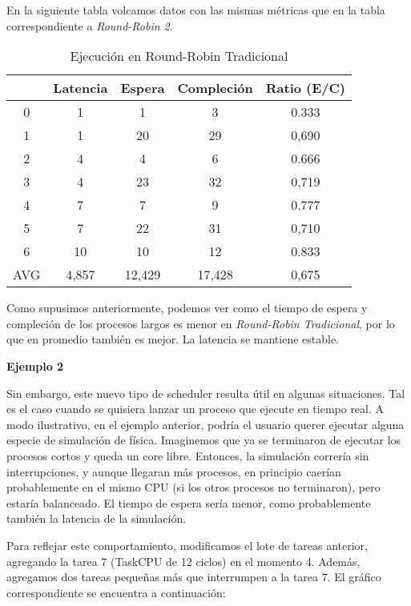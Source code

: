 En la siguiente tabla volcamos datos con las mismas métricas que en la tabla correspondiente a \textit{Round-Robin 2}.

\begin{table}[h]
  \caption{Ejecución en Round-Robin Tradicional}
  \centering
    \begin{tabular}{c c c c c}
    \hline
          & Latencia & Espera & Compleción & Ratio (E/C) \\
    \hline
        0 &     1    &    1   &      3     &    0.333    \\
        1 &     1    &   20   &     29     &    0,690    \\
        2 &     4    &    4   &      6     &    0.666    \\
        3 &     4    &   23   &     32     &    0,719    \\
        4 &     7    &    7   &      9     &    0.777    \\
        5 &     7    &   22   &     31     &    0,710    \\
        6 &     10   &   10   &     12     &    0.833    \\
        AVG & 4,857  & 12,429 &   17,428   &    0,675    \\
    \end{tabular}
\end{table}

Como supusimos anteriormente, podemos ver como el tiempo de espera y compleción de los procesos largos es menor en \textit{Round-Robin Tradicional}, por lo que en promedio también es mejor. La latencia se mantiene estable.

\bigskip

\textbf{Ejemplo 2}

Sin embargo, este nuevo tipo de scheduler resulta útil en algunas situaciones. Tal es el caso cuando se quisiera lanzar un proceso que ejecute en tiempo real. A modo ilustrativo, en el ejemplo anterior, podría el usuario querer ejecutar alguna especie de simulación de física. Imaginemos que ya se terminaron de ejecutar los procesos cortos y queda un core libre. Entonces, la simulación correría sin interrupciones, y aunque llegaran más procesos, en principio caerían probablemente  en el mismo CPU (si los otros procesos no terminaron), pero estaría balanceado. El tiempo de espera sería menor, como probablemente también la latencia de la simulación.

Para reflejar este comportamiento, modificamos el lote de tareas anterior, agregando la tarea 7 (TaskCPU de 12 ciclos) en el momento 4. Además, agregamos dos tareas pequeñas más que interrumpen a la tarea 7. El gráfico correspondiente se encuentra a continuación:


